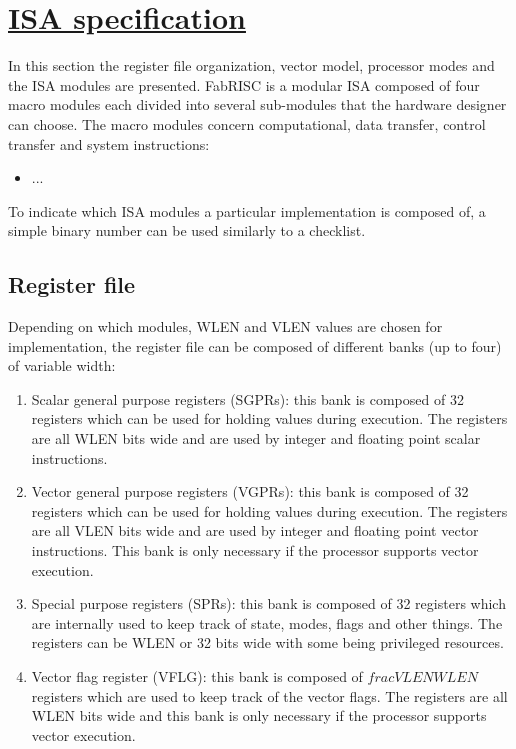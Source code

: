 \documentclass{article}
\begin{document}
    \section[ISA specification]{\LARGE\underline{ISA specification}}

        In this section the register file organization, vector model, processor modes and the ISA modules are presented. FabRISC is a modular ISA composed of four macro modules each divided into several sub-modules that the hardware designer can choose. The macro modules concern computational, data transfer, control transfer and system instructions:

        \begin{itemize}

           \item ...

        \end{itemize}

        To indicate which ISA modules a particular implementation is composed of, a simple binary number can be used similarly to a checklist.

        \subsection{Register file}

            Depending on which modules, WLEN and VLEN values are chosen for implementation, the register file can be composed of different banks (up to four) of variable width:

            \begin{enumerate}

                \item Scalar general purpose registers (SGPRs): this bank is composed of 32 registers which can be used for holding values during execution. The registers are all WLEN bits wide and are used by integer and floating point scalar instructions.
                \item Vector general purpose registers (VGPRs): this bank is composed of 32 registers which can be used for holding values during execution. The registers are all VLEN bits wide and are used by integer and floating point vector instructions. This bank is only necessary if the processor supports vector execution.
                \item Special purpose registers (SPRs): this bank is composed of 32 registers which are internally used to keep track of state, modes, flags and other things. The registers can be WLEN or 32 bits wide with some being privileged resources.
                \item Vector flag register (VFLG): this bank is composed of \(frac{VLEN}{WLEN}\) registers which are used to keep track of the vector flags. The registers are all WLEN bits wide and this bank is only necessary if the processor supports vector execution.

            \end{enumerate}
\end{document}
